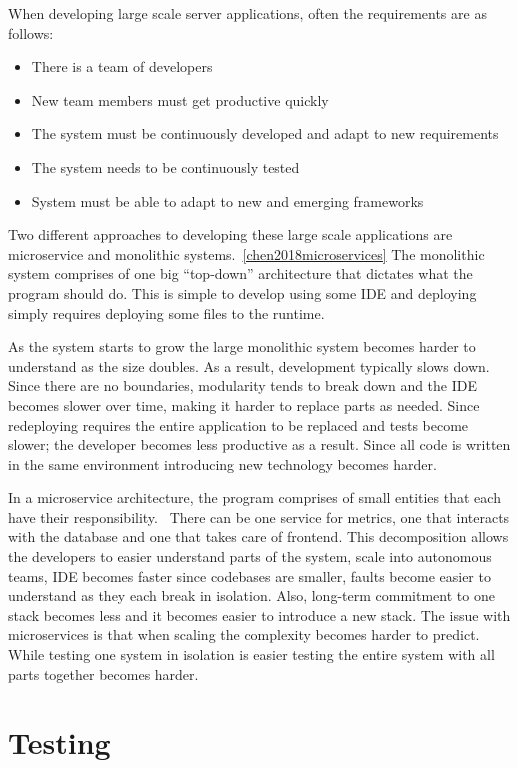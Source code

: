 When developing large scale server applications, often the requirements are as
follows:

\begin{itemize}
    \item There is a team of developers
    \item New team members must get productive quickly
    \item The system must be continuously developed and adapt to new
        requirements
    \item The system needs to be continuously tested
    \item System must be able to adapt to new and emerging frameworks
\end{itemize}

Two different approaches to developing these large scale applications are
microservice and monolithic systems.~\ref{chen2018microservices} The monolithic
system comprises of one big ``top-down'' architecture that dictates what the
program should do. This is simple to develop using some IDE and deploying simply
requires deploying some files to the runtime. 

As the system starts to grow the large monolithic system becomes harder to
understand as the size doubles. As a result, development typically slows down.
Since there are no boundaries, modularity tends to break down and the IDE
becomes slower over time, making it harder to replace parts as needed. Since
redeploying requires the entire application to be replaced and tests become
slower; the developer becomes less productive as a result. Since all code is
written in the same environment introducing new technology becomes harder.

In a microservice architecture, the program comprises of small entities that each
have their responsibility.~\cite{chenlianping} There can be one service for
metrics, one that interacts with the database and one that takes care of
frontend. This decomposition allows the developers to easier understand parts of
the system, scale into autonomous teams, IDE becomes faster since codebases are
smaller, faults become easier to understand as they each break in isolation.
Also, long-term commitment to one stack becomes less and it becomes easier to
introduce a new stack.  The issue with microservices is that when scaling the
complexity becomes harder to predict. While testing one system in isolation is
easier testing the entire system with all parts together becomes harder.

\section{Testing}

